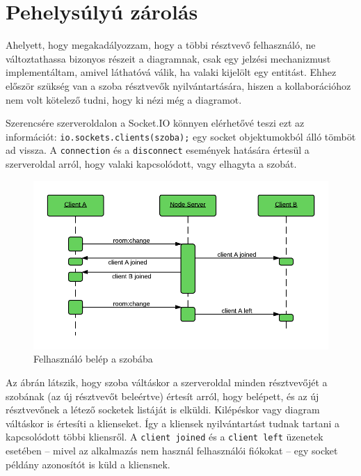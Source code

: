 
\section{Pehelysúlyú zárolás}

Ahelyett, hogy megakadályozzam, hogy a többi résztvevő felhasználó, ne változtathassa bizonyos részeit a diagramnak, csak egy jelzési mechanizmust implementáltam, amivel láthatóvá válik, ha valaki kijelölt egy entitást. Ehhez először szükség van a szoba résztvevők nyilvántartására, hiszen a kollaborációhoz nem volt kötelező tudni, hogy ki nézi még a diagramot.

Szerencsére szerveroldalon a Socket.IO könnyen elérhetővé teszi ezt az információt: \lstinline{io.sockets.clients(szoba);} egy socket objektumokból álló tömböt ad vissza. A \lstinline{connection} és a \lstinline{disconnect} események hatására értesül a szerveroldal arról, hogy valaki kapcsolódott, vagy elhagyta a szobát.

\begin{figure}[!ht]
\centering
\includegraphics[width=15cm,keepaspectratio]{figures/join-seq.png}
\caption{Felhasználó belép a szobába}
\label{fig:joinseq}
\end{figure}

Az ábrán látszik, hogy szoba váltáskor a szerveroldal minden résztvevőjét a szobának (az új résztvevőt beleértve) értesít arról, hogy belépett, és az új résztvevőnek a létező socketek listáját is elküldi. Kilépéskor vagy diagram váltáskor is értesíti a klienseket. Így a kliensek nyilvántartást tudnak tartani a kapcsolódott többi kliensről. A \lstinline{client joined} és a \lstinline{client left} üzenetek esetében -- mivel az alkalmazás nem használ felhasználói fiókokat -- egy socket példány azonosítót is küld a kliensnek.

